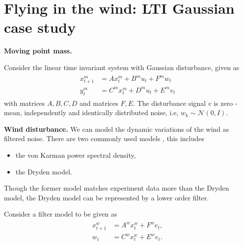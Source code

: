 \documentclass{ifacconf}
\begin{document}
\section{Flying in the wind:  LTI Gaussian case study}



\noindent\textbf{Moving point mass.}
    
Consider the linear time invariant system with Gaussian disturbance, given as 
\begin{align}\begin{aligned}
	x^m_{t+1} &= A x^m_{t}+B^mu_{t}+ F^m w_{t}\\
	y^m_{t}&=C^m x^m_{t}+D^m u_{t}+E^m v_{t}\end{aligned}
\end{align}
with matrices $A,B,C,D$ and matrices $F,E$. 
The disturbance signal $v$ is zero -mean, independently and identically  distributed noise, i.e, $w_k\sim \mathcal{N}(0,I)$.

 
 \noindent\textbf{Wind disturbance.}
We can model the dynamic variations of the wind as filtered noise. 
There are two commonly used models  \citep{richardson2013quantifying},  this includes
\begin{itemize}
	\item the von Karman power spectral density,
	\item the Dryden model.
\end{itemize}
 
 Though the former model matches experiment data more than the 
 Dryden model, the Dryden model can be represented by  a lower order filter.
 
Consider a filter model to be given as
\begin{align}
	\begin{aligned}
	x_{t+1}^w &= A^w x_{t}^w+ F^w e_{t},\\
	w_{t}&=C^w x_{t}^w+E^w e_{t}.
	\end{aligned}
\end{align}
\end{document}
